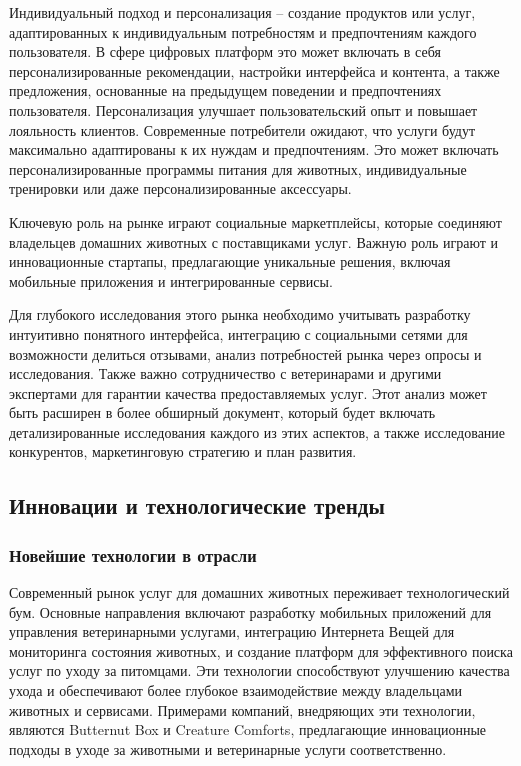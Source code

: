 Индивидуальный подход и персонализация – создание продуктов или услуг, адаптированных к индивидуальным потребностям и предпочтениям каждого пользователя. В сфере цифровых платформ это может включать в себя персонализированные рекомендации, настройки интерфейса и контента, а также предложения, основанные на предыдущем поведении и предпочтениях пользователя. Персонализация улучшает пользовательский опыт и повышает лояльность клиентов. Современные потребители ожидают, что услуги будут максимально адаптированы к их нуждам и предпочтениям. Это может включать персонализированные программы питания для животных, индивидуальные тренировки или даже персонализированные аксессуары.

Ключевую роль на рынке играют социальные маркетплейсы, которые соединяют владельцев домашних животных с поставщиками услуг. Важную роль играют и инновационные стартапы, предлагающие уникальные решения, включая мобильные приложения и интегрированные сервисы.

Для глубокого исследования этого рынка необходимо учитывать разработку интуитивно понятного интерфейса, интеграцию с социальными сетями для возможности делиться отзывами, анализ потребностей рынка через опросы и исследования. Также важно сотрудничество с ветеринарами и другими экспертами для гарантии качества предоставляемых услуг. Этот анализ может быть расширен в более обширный документ, который будет включать детализированные исследования каждого из этих аспектов, а также исследование конкурентов, маркетинговую стратегию и план развития.
\subsection{Инновации и технологические тренды}
\subsubsection{Новейшие технологии в отрасли}

Современный рынок услуг для домашних животных переживает технологический бум. Основные направления включают разработку мобильных приложений для управления ветеринарными услугами, интеграцию Интернета Вещей для мониторинга состояния животных, и создание платформ для эффективного поиска услуг по уходу за питомцами. Эти технологии способствуют улучшению качества ухода и обеспечивают более глубокое взаимодействие между владельцами животных и сервисами. Примерами компаний, внедряющих эти технологии, являются Butternut Box и Creature Comforts, предлагающие инновационные подходы в уходе за животными и ветеринарные услуги соответственно.
